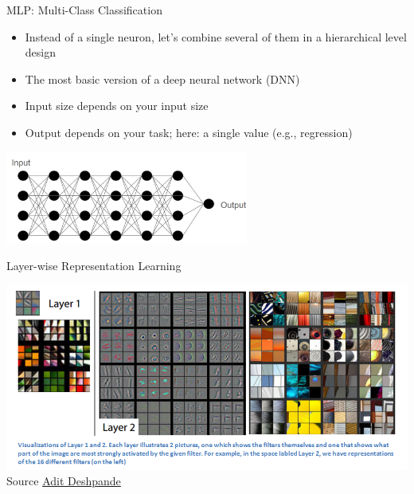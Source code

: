\documentclass[aspectratio=169]{../latex_main/tntbeamer}  %
\begin{document}
  	\begin{frame}{MLP: Multi-Class Classification}

        \begin{itemize}
            \item Instead of a single neuron, let's combine several of them in a hierarchical level design
            \item The most basic version of a deep neural network (DNN)
            \item Input size depends on your input size
            \item Output depends on your task; here: a single value (e.g., regression)
        \end{itemize}

        \centering
        \includegraphics[width=0.6\textwidth]{figures/mlp1.png}
                
	\end{frame}


        \begin{frame}{Layer-wise Representation Learning}

            \centering
            \includegraphics[width=.8\linewidth]{075_deep_learning/figures/deconvnet.png}\\
            Source \href{https://adeshpande3.github.io/The-9-Deep-Learning-Papers-You-Need-To-Know-About.html}{Adit Deshpande}
            
        \end{frame}
        
\end{document}
